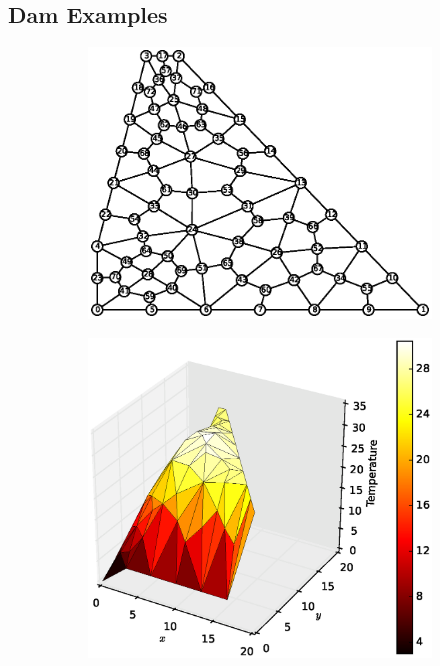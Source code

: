 \documentclass[10pt, a4paper]{article}
\begin{document}
\subsection{Dam Examples}


\begin{figure}[H]
\centering
	\begin{subfigure}[H]{0.3\textwidth}
		\includegraphics[width=1.2\textwidth]{fig/exdam1_1.eps}
		\caption{}
		\label{fig:1}
	\end{subfigure}
	\begin{subfigure}[H]{0.33\textwidth}
		\includegraphics[width=\textwidth]{fig/exdam1_2.eps}

\end{subfigure}
\end{figure}
\end{document}
